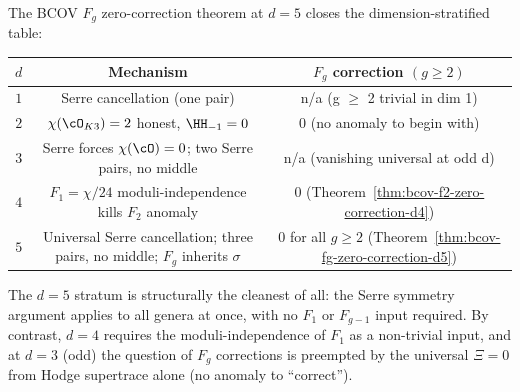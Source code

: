 \begin{remark}
\label{rem:cy-strat-d5-cross-d-fg-mechanisms}
The BCOV $F_g$ zero-correction theorem at $d = 5$ closes the
dimension-stratified table:

\begin{center}
\begin{tabular}{ccc}
\toprule
$d$ & Mechanism & $F_g$ correction $(g \geq 2)$ \\
\midrule
$1$ & Serre cancellation (one pair) & n/a (g $\geq$ 2 trivial in dim 1) \\
$2$ & $\chi(\cO_{K3}) = 2$ honest, $\HH_{-1} = 0$ &
$0$ (no anomaly to begin with) \\
$3$ & Serre forces $\chi(\cO) = 0$; two Serre pairs, no middle &
n/a (vanishing universal at odd d) \\
$4$ & $F_1 = \chi/24$ moduli-independence kills $F_2$ anomaly &
$0$ (Theorem~\ref{thm:bcov-f2-zero-correction-d4}) \\
$5$ & Universal Serre cancellation; three pairs, no middle; $F_g$
inherits $\sigma$ &
$0$ for all $g \geq 2$
(Theorem~\ref{thm:bcov-fg-zero-correction-d5}) \\
\bottomrule
\end{tabular}
\end{center}

The $d = 5$ stratum is structurally the cleanest of all: the Serre
symmetry argument applies to all genera at once, with no $F_1$ or
$F_{g-1}$ input required. By contrast, $d = 4$ requires the
moduli-independence of $F_1$ as a non-trivial input, and at $d = 3$
(odd) the question of $F_g$ corrections is preempted by the universal
$\Xi = 0$ from Hodge supertrace alone (no anomaly to ``correct'').
\end{remark}

